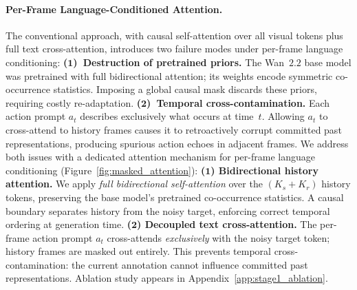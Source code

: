 \paragraph{Per-Frame Language-Conditioned Attention. }
The conventional approach, with causal self-attention over all visual tokens plus full text cross-attention, introduces two failure modes under per-frame language conditioning:
\textbf{($\mathbf{1}$)~Destruction of pretrained priors.} The Wan~$2.2$ base model was pretrained with full bidirectional attention; its weights encode symmetric co-occurrence statistics. Imposing a global causal mask discards these priors, requiring costly re-adaptation.
\textbf{($\mathbf{2}$)~Temporal cross-contamination.} Each action prompt $a_t$ describes exclusively what occurs at time~$t$. Allowing $a_t$ to cross-attend to history frames causes it to retroactively corrupt committed past representations, producing spurious action echoes in adjacent frames.
We address both issues with a dedicated attention mechanism for
per-frame language conditioning (Figure~\ref{fig:masked_attention}):
\textbf{($\mathbf{1}$) Bidirectional history attention.}
We apply \textit{full bidirectional self-attention} over the $(K_s + K_r)$ history tokens, preserving the base model's pretrained co-occurrence statistics. A causal boundary separates history from the noisy target, enforcing correct temporal ordering at generation time.
\textbf{($\mathbf{2}$) Decoupled text cross-attention.}
The per-frame action prompt $a_t$ cross-attends \emph{exclusively} with the noisy target token; history frames are masked out entirely. This prevents temporal cross-contamination: the current annotation cannot influence committed past representations. Ablation study appears in Appendix~\ref{app:stage1_ablation}.

